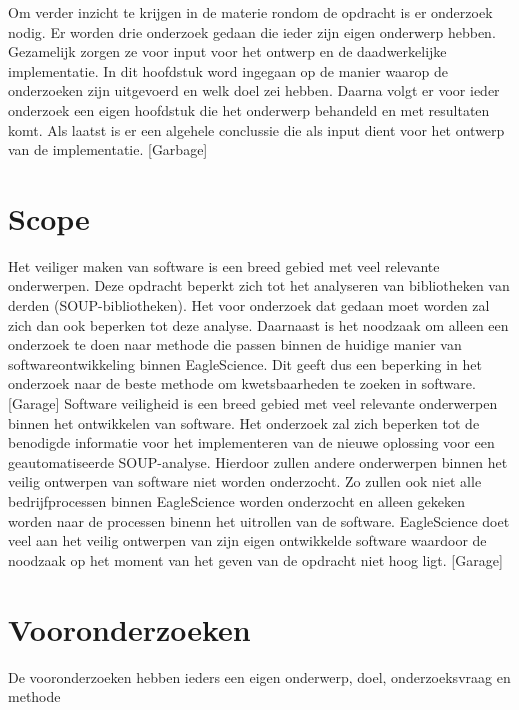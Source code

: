 Om verder inzicht te krijgen in de materie rondom de opdracht is er onderzoek nodig. Er worden drie onderzoek gedaan die ieder zijn eigen onderwerp hebben. Gezamelijk zorgen ze voor input voor het ontwerp en de daadwerkelijke implementatie. In dit hoofdstuk word ingegaan op de manier waarop de onderzoeken zijn uitgevoerd en welk doel zei hebben. Daarna volgt er voor ieder onderzoek een eigen hoofdstuk die het onderwerp behandeld en met resultaten komt. Als laatst is er een algehele conclussie die als input dient voor het ontwerp van de implementatie.
[Garbage]

\section{Scope}\label{sec:Scope}
Het veiliger maken van software is een breed gebied met veel relevante onderwerpen. Deze opdracht beperkt zich tot het analyseren van bibliotheken van derden (SOUP-bibliotheken). Het voor onderzoek dat gedaan moet worden zal zich dan ook beperken tot deze analyse. Daarnaast is het noodzaak om alleen een onderzoek te doen naar methode die passen binnen de huidige manier van softwareontwikkeling binnen EagleScience. Dit geeft dus een beperking in het onderzoek naar de beste methode om kwetsbaarheden te zoeken in software.
[Garage]
Software veiligheid is een breed gebied met veel relevante onderwerpen binnen het ontwikkelen van software.
Het onderzoek zal zich beperken tot de benodigde informatie voor het implementeren van de nieuwe oplossing voor een geautomatiseerde SOUP-analyse. Hierdoor zullen andere onderwerpen binnen het veilig ontwerpen van software niet worden onderzocht. Zo zullen ook niet alle bedrijfprocessen binnen EagleScience worden onderzocht en alleen gekeken worden naar de processen binenn het uitrollen van de software. EagleScience doet veel aan het veilig ontwerpen van zijn eigen ontwikkelde software waardoor de noodzaak op het moment van het geven van de opdracht niet hoog ligt.
[Garage]
\section{Vooronderzoeken}\label{sec:vooronderzoeken}
De vooronderzoeken hebben ieders een eigen onderwerp, doel, onderzoeksvraag en methode
